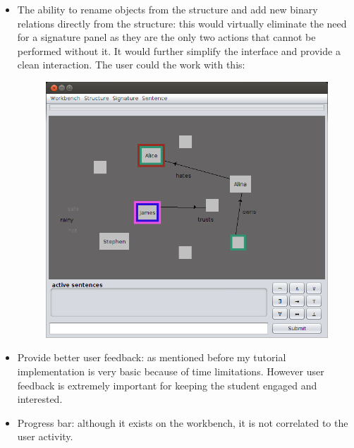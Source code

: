\documentclass{report}
\begin{document}
\begin{itemize}
\item The ability to rename objects from the structure and add new binary 
relations directly from the structure: this would virtually eliminate the need 
for a signature panel as they are the only two actions that cannot be performed 
without it. It would further simplify the interface and provide a clean 
interaction. The user could the work with this:
\begin{figure}[h!]
\centering \includegraphics[scale=0.45]{simple.png}
\end{figure}

\item Provide better user feedback: as mentioned before my tutorial 
implementation is very basic because of time limitations. However user 
feedback is extremely important for keeping the student engaged and interested.
\item Progress bar: although it exists on the workbench, it is not correlated 
to the user activity. 
\end{itemize}
\end{document}
